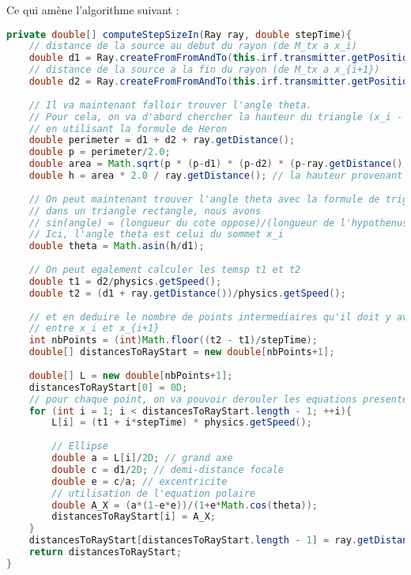 Ce qui amène l'algorithme suivant :
\begin{lstlisting}[language=java]
private double[] computeStepSizeIn(Ray ray, double stepTime){
    // distance de la source au debut du rayon (de M_tx a x_i)
    double d1 = Ray.createFromFromAndTo(this.irf.transmitter.getPosition(), ray.from).getDistance();
    // distance de la source a la fin du rayon (de M_tx a x_{i+1})
    double d2 = Ray.createFromFromAndTo(this.irf.transmitter.getPosition(), ray.to).getDistance();
    
    // Il va maintenant falloir trouver l'angle theta.
    // Pour cela, on va d'abord chercher la hauteur du triangle (x_i - p - M_tx)
    // en utilisant la formule de Heron
    double perimeter = d1 + d2 + ray.getDistance();
    double p = perimeter/2.0;
    double area = Math.sqrt(p * (p-d1) * (p-d2) * (p-ray.getDistance()));
    double h = area * 2.0 / ray.getDistance(); // la hauteur provenant de la source M_tx
    
    // On peut maintenant trouver l'angle theta avec la formule de trigonometrie suivante :
    // dans un triangle rectangle, nous avons
    // sin(angle) = (longueur du cote oppose)/(longueur de l'hypothenuse)
    // Ici, l'angle theta est celui du sommet x_i
    double theta = Math.asin(h/d1);
    
    // On peut egalement calculer les temsp t1 et t2
    double t1 = d2/physics.getSpeed();
    double t2 = (d1 + ray.getDistance())/physics.getSpeed();
    
    // et en deduire le nombre de points intermediaires qu'il doit y avoir
    // entre x_i et x_{i+1}
    int nbPoints = (int)Math.floor((t2 - t1)/stepTime);
    double[] distancesToRayStart = new double[nbPoints+1];
    
    double[] L = new double[nbPoints+1];
    distancesToRayStart[0] = 0D;
    // pour chaque point, on va pouvoir derouler les equations presentees plus haut
    for (int i = 1; i < distancesToRayStart.length - 1; ++i){
        L[i] = (t1 + i*stepTime) * physics.getSpeed();
    
        // Ellipse
        double a = L[i]/2D; // grand axe
        double c = d1/2D; // demi-distance focale
        double e = c/a; // excentricite
        // utilisation de l'equation polaire
        double A_X = (a*(1-e*e))/(1+e*Math.cos(theta));
        distancesToRayStart[i] = A_X;
    }
    distancesToRayStart[distancesToRayStart.length - 1] = ray.getDistance();
    return distancesToRayStart;
}
\end{lstlisting}

